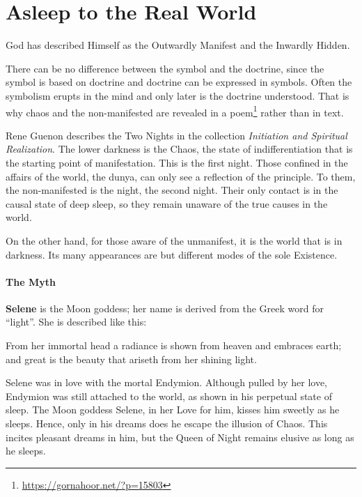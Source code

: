 \section{Asleep to the Real World}

\begin{quotex}
God has described Himself as the Outwardly Manifest and the Inwardly Hidden.
\end{quotex}


There can be no difference between the symbol and the doctrine, since the symbol is based on doctrine and doctrine can be expressed in symbols. Often the symbolism erupts in the mind and only later is the doctrine understood. That is why chaos and the non-manifested are revealed in a poem\footnote{\url{https://gornahoor.net/?p=15803}} rather than in text.

Rene Guenon describes the Two Nights in the collection \emph{Initiation and Spiritual Realization}. The lower darkness is the Chaos, the state of indifferentiation that is the starting point of manifestation. This is the first night. Those confined in the affairs of the world, the dunya, can only see a reflection of the principle. To them, the non-manifested is the night, the second night. Their only contact is in the causal state of deep sleep, so they remain unaware of the true causes in the world.

On the other hand, for those aware of the unmanifest, it is the world that is in darkness. Its many appearances are but different modes of the sole Existence.

\paragraph{The Myth}


\textbf{Selene} is the Moon goddess; her name is derived from the Greek word for ``light''. She is described like this:

\begin{quotex}
From her immortal head a radiance is shown from heaven and embraces earth; and great is the beauty that ariseth from her shining light.
\end{quotex}


Selene was in love with the mortal Endymion. Although pulled by her love, Endymion was still attached to the world, as shown in his perpetual state of sleep. The Moon goddess Selene, in her Love for him, kisses him sweetly as he sleeps. Hence, only in his dreams does he escape the illusion of Chaos. This incites pleasant dreams in him, but the Queen of Night remains elusive as long as he sleeps.

